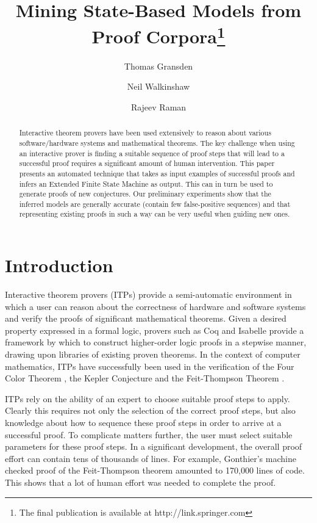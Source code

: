 \documentclass{llncs}
\begin{document}
\title{Mining State-Based Models from Proof Corpora\thanks{The final publication is available at http://link.springer.com}}
\author{Thomas Gransden \and Neil Walkinshaw \and Rajeev Raman}
\maketitle

\begin{abstract}
Interactive theorem provers have been used extensively to reason about various software/hardware systems and mathematical theorems. The key challenge when using an interactive prover is finding a suitable sequence of proof steps that will lead to a successful proof requires a significant amount of human intervention. This paper presents an automated technique that takes as input examples of successful proofs and infers an Extended Finite State Machine as output. This can in turn be used to generate proofs of new conjectures. Our preliminary experiments show that the inferred models are generally accurate (contain few false-positive sequences) and that representing existing proofs in such a way can be very useful when guiding new ones.
\end{abstract}

\section{Introduction}
\label{sec:introduction}
Interactive theorem provers (ITPs) provide a semi-automatic environment in which a user can reason about the correctness of hardware and software systems and verify the proofs of significant mathematical theorems. Given a desired property expressed in a formal logic, provers such as Coq \cite{Coq:manual} and Isabelle \cite{Isabelle02} provide a framework by which to construct higher-order logic proofs in a stepwise manner, drawing upon libraries of existing proven theorems. In the context of computer mathematics, ITPs have successfully been used in the verification of the Four Color Theorem \cite{Gonthier07a}, the Kepler Conjecture \cite{Hales05} and the Feit-Thompson Theorem \cite{Gonthier13}.

ITPs rely on the ability of an expert to choose suitable proof steps to apply. Clearly this requires not only the selection of the correct proof steps, but also knowledge about how to sequence these proof steps in order to arrive at a successful proof. To complicate matters further, the user must select suitable parameters for these proof steps. In a significant development, the overall proof effort can contain tens of thousands of lines. For example, Gonthier's machine checked proof of the Feit-Thompson theorem amounted to 170,000 lines of code. This shows that a lot of human effort was needed to complete the proof.
\end{document}
